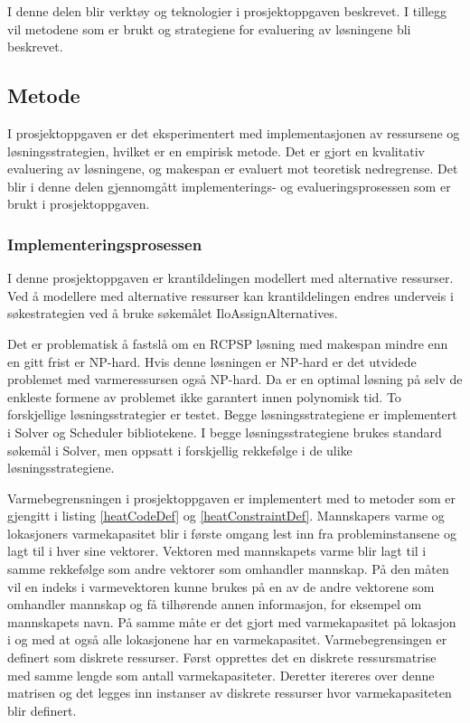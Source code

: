 I denne delen blir verktøy og teknologier i prosjektoppgaven beskrevet. I tillegg vil metodene som er brukt og strategiene for evaluering av løsningene bli beskrevet.

\subsection{Metode}
I prosjektoppgaven er det eksperimentert med implementasjonen av ressursene og løsningsstrategien, hvilket er en empirisk metode. Det er gjort en kvalitativ evaluering av løsningene, og makespan er evaluert mot teoretisk nedregrense. Det blir i denne delen gjennomgått implementerings- og evalueringsprosessen som er brukt i prosjektoppgaven.

\subsubsection{Implementeringsprosessen}
\label{sec:implprocess}
I denne prosjektoppgaven er krantildelingen modellert med alternative ressurser. Ved å modellere med alternative ressurser kan krantildelingen endres underveis i søkestrategien ved å bruke søkemålet IloAssignAlternatives.

Det er problematisk å fastslå om en RCPSP løsning med makespan mindre enn en gitt frist er NP-hard. Hvis denne løsningen er NP-hard er det utvidede problemet med varmeressursen også NP-hard. Da er en optimal løsning på selv de enkleste formene av problemet ikke garantert innen polynomisk tid. To forskjellige løsningsstrategier er testet. Begge løsningsstrategiene er implementert i Solver og Scheduler bibliotekene. I begge løsningsstrategiene brukes standard søkemål i Solver, men oppsatt i forskjellig rekkefølge i de ulike løsningsstrategiene.

Varmebegrensningen i prosjektoppgaven er implementert med to metoder som er gjengitt i listing \ref{heatCodeDef} og \ref{heatConstraintDef}. Mannskapers varme og lokasjoners varmekapasitet blir i første omgang lest inn fra probleminstansene og lagt til i hver sine vektorer. Vektoren med mannskapets varme blir lagt til i samme rekkefølge som andre vektorer som omhandler mannskap. På den måten vil en indeks i varmevektoren kunne brukes på en av de andre vektorene som omhandler mannskap og få tilhørende annen informasjon, for eksempel om mannskapets navn. På samme måte er det gjort med varmekapasitet på lokasjon i og med at også alle lokasjonene har en varmekapasitet. Varmebegrensingen er definert som diskrete ressurser. Først opprettes det en diskrete ressursmatrise med samme lengde som antall varmekapasiteter. Deretter itereres over denne matrisen og det legges inn instanser av diskrete ressurser hvor varmekapasiteten blir definert.

